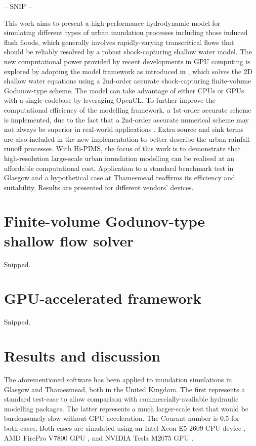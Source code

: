 -- SNIP --

This work aims to present a high-performance hydrodynamic model for simulating different types of urban inundation processes including those induced flash floods, which generally involves rapidly-varying transcritical flows that should be reliably resolved by a robust shock-capturing shallow water model. The new computational power provided by recent developments in GPU computing is explored by adopting the model framework as introduced in \citet{Smith2013}, which solves the 2D shallow water equations using a 2nd-order accurate shock-capturing finite-volume Godunov-type scheme. The model can take advantage of either CPUs or GPUs with a single codebase by leveraging OpenCL. To further improve the computational efficiency of the modelling framework, a 1st-order accurate scheme is implemented, due to the fact that a 2nd-order accurate numerical scheme may not always be superior in real-world applications \citep{Zhang2013}. Extra source and sink terms are also included in the new implementation to better describe the urban rainfall-runoff processes. With Hi-PIMS, the focus of this work is to demonstrate that high-resolution large-scale urban inundation modelling can be realised at an affordable computational cost. Application to a standard benchmark test in Glasgow and a hypothetical case at Thamesmead reaffirms its efficiency and suitability. Results are presented for different vendors' devices.

\section{Finite-volume Godunov-type shallow flow solver}

Snipped.

\section{GPU-accelerated framework}

Snipped.

\section{Results and discussion}

The aforementioned software has been applied to inundation simulations in Glasgow and Thamesmead, both in the United Kingdom. The first represents a standard test-case to allow comparison with commercially-available hydraulic modelling packages. The latter represents a much larger-scale test that would be burdensomely slow without GPU acceleration. The Courant number is 0.5 for both cases. Both cases are simulated using an Intel Xeon E5-2609 CPU device \citep{Intel_12}, AMD FirePro V7800 GPU \citep{AdvancedMicroDevicesInc2010a}, and NVIDIA Tesla M2075 GPU \citep{NVIDIACorporation2011}.

